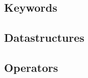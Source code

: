 \documentclass[a4paper,titlepage]{article}
\begin{document}
  \subsection{Keywords}



  \subsection{Datastructures}




  \subsection{Operators}



\newpage
\end{document}
